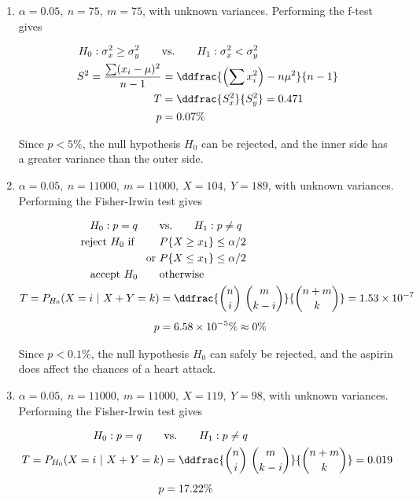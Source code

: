 \begin{enumerate}
	\item $\alpha = 0.05,\ n = 75,\ m = 75$, with unknown variances. Performing the f-test gives
	
	\begin{align}
		H_0 : \sigma_x^2 \geq \sigma_y^2 \qquad &\text{vs.} \qquad H_1 : \sigma_x^2 < \sigma_y^2 \nonumber \\
		S^2 = \frac{\sum (x_i - \mu)^2}{n-1} &= \ddfrac{\left(\sum x_i^2\right) - n\mu^2}{n-1} \nonumber \\
		T &= \ddfrac{ S^2_x }{S^2_y} = 0.471 \nonumber \\
		p &= 0.07\% 
	\end{align}
	
	Since $ p < 5\% $, the null hypothesis $ H_0 $ can be rejected, and the inner side has a greater variance than the outer side.
	
	\item $\alpha = 0.05,\ n = 11000,\ m = 11000,\ X = 104,\ Y = 189$, with unknown variances. Performing the Fisher-Irwin test gives
	
	\begin{align}
		H_0 : p  = q \qquad &\text{vs.} \qquad H_1 : p  \neq q \nonumber \\
		\text{reject $ H_0 $ if } \qquad & P\{X \geq x_1\} \leq \alpha/2  \nonumber \\
		\text{or }& P\{X \leq x_1\} \leq \alpha/2 \nonumber \\
		\text{accept $ H_0 $} \qquad & \text{otherwise} \nonumber \\
		T = P_{H_0}(X = i\ |\ X+Y = k) &= \ddfrac{\binom{n}{i}\ \binom{m}{k-i}}{\binom{n+m}{k}} = 1.53 \times 10^{-7} \nonumber \\[1ex]
		p &= 6.58 \times 10^{-5}\% \approx 0\%
	\end{align}
	
	Since $ p < 0.1\% $, the null hypothesis $ H_0 $ can safely be rejected, and the aspirin does affect the chances of a heart attack.
	
	
	\item $\alpha = 0.05,\ n = 11000,\ m = 11000,\ X = 119,\ Y = 98$, with unknown variances. Performing the Fisher-Irwin test gives
	
	\begin{align}
		H_0 : p  = q \qquad &\text{vs.} \qquad H_1 : p  \neq q \nonumber \\
		T = P_{H_0}(X = i\ |\ X+Y = k) &= \ddfrac{\binom{n}{i}\ \binom{m}{k-i}}{\binom{n+m}{k}} = 0.019 \nonumber \\[1ex]
		p &= 17.22\%
	\end{align}
	

\end{enumerate}
